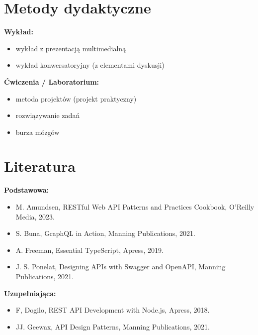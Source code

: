 \documentclass[12pt, a4paper]{article}
\begin{document}
\section{Metody dydaktyczne}

\textbf{Wykład:}
\begin{itemize}
  \item wykład z prezentacją multimedialną
  \item wykład konwersatoryjny (z elementami dyskusji)
\end{itemize}
\vspace{4pt}
\textbf{Ćwiczenia / Laboratorium:}
\begin{itemize}
  \item metoda projektów (projekt praktyczny)
  \item rozwiązywanie zadań
  \item burza mózgów
\end{itemize}
\vspace{4pt}


\section{Literatura}

\textbf{Podstawowa:}
\begin{itemize}
  \item M. Amundsen, RESTful Web API Patterns and Practices Cookbook, O’Reilly Media, 2023.
  \item S. Buna, GraphQL in Action, Manning Publications, 2021.
  \item A. Freeman, Essential TypeScript, Apress, 2019.
  \item J. S. Ponelat, Designing APIs with Swagger and OpenAPI, Manning Publications, 2021.
\end{itemize}

\textbf{Uzupełniająca:}
\begin{itemize}
  \item F, Dogilo, REST API Development with Node.js, Apress, 2018.
  \item JJ. Geewax, API Design Patterns, Manning Publications, 2021.
\end{itemize}
\end{document}
